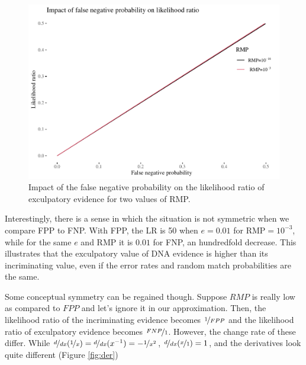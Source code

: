 \documentclass[
  10pt,
  dvipsnames,enabledeprecatedfontcommands]{scrartcl}
\begin{document}
\begin{figure}

\begin{center}\includegraphics[width=1\linewidth]{lr-chapter3_files/figure-latex/fig-fnplr-1} \end{center}
\label{fig:fnplr}
\caption{Impact of the false negative probability on the likelihood ratio of exculpatory evidence for two values of RMP.}
\end{figure}

Interestingly, there is a sense in which the situation is not symmetric
when we compare FPP to FNP. With FPP, the LR is 50 when \(e=0.01\) for
RMP\(=10^{-3}\), while for the same \(e\) and RMP it is \(0.01\) for
FNP, an hundredfold decrease. This illustrates that the exculpatory
value of DNA evidence is higher than its incriminating value, even if
the error rates and random match probabilities are the same.

Some conceptual symmetry can be regained though. Suppose \(RMP\) is
really low as compared to \(FPP\) and let's ignore it in our
approximation. Then, the likelihood ratio of the incriminating evidence
becomes \(\nicefrac{1}{FPP}\) and the likelihood ratio of exculpatory
evidence becomes \(\nicefrac{FNP}{1}\). However, the change rate of
these differ. While
\(\nicefrac{d}{dx}(\nicefrac{1}{x}) = \nicefrac{d}{dx} (x^{-1}) = - \nicefrac{1}{x^2}\),
\(\nicefrac{d}{dx}(\nicefrac{x}{1})=1\), and the derivatives look quite
different (Figure \ref{fig:der})
\end{document}

